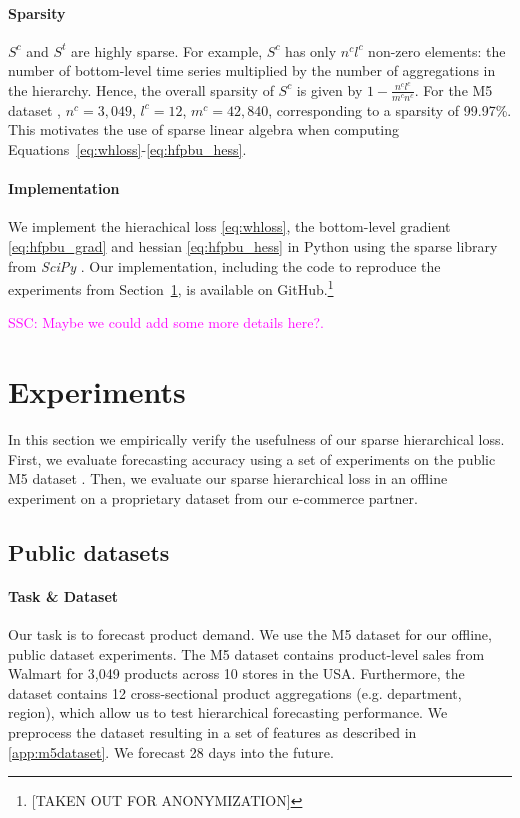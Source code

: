 \documentclass[preprint, 3p, times, twocolumn]{elsarticle}
\newcommand{\ssc}[1]{\textcolor{magenta}{SSC: #1.}}
\begin{document}
\paragraph{Sparsity} \(S^c\) and \(S^t\) are highly sparse. For example, \(S^c\) has only \(n^cl^c\) non-zero elements: the number of bottom-level time series multiplied by the number of aggregations in the hierarchy. Hence, the overall sparsity of \(S^c\) is given by \( 1 - \frac{n^cl^c}{m^cn^c} \). For the M5 dataset \cite{makridakis_m5_2021}, \(n^c = 3,049\), \(l^c = 12\), \(m^c=42,840\), corresponding to a sparsity of 99.97\%. This motivates the use of sparse linear algebra when computing Equations~\eqref{eq:whloss}-\eqref{eq:hfpbu_hess}.

\paragraph{Implementation} We implement the hierachical loss \eqref{eq:whloss}, the bottom-level gradient \eqref{eq:hfpbu_grad} and hessian \eqref{eq:hfpbu_hess} in Python using the sparse library from \textit{SciPy} \cite{virtanen_scipy_2020}. Our implementation, including the code to reproduce the experiments from Section~\ref{sec:experiments}, is available on GitHub.\footnote{[TAKEN OUT FOR ANONYMIZATION]}

\ssc{Maybe we could add some more details here?}

\section{Experiments}
  \label{sec:experiments}
  In this section we empirically verify the usefulness of our sparse hierarchical loss. First, we evaluate forecasting accuracy using a set of experiments on the public M5 dataset \cite{makridakis_m5_2021}. Then, we evaluate our sparse hierarchical loss in an offline experiment on a proprietary dataset from our e-commerce partner.

  \subsection{Public datasets} \label{subsec:publicdatasets}
  \paragraph{Task \& Dataset} Our task is to forecast product demand. We use the M5 dataset \cite{makridakis_m5_2021} for our offline, public dataset experiments. The M5 dataset contains product-level sales from Walmart for 3,049 products across 10 stores in the USA. Furthermore, the dataset contains 12 cross-sectional product aggregations (e.g. department, region), which allow us to test hierarchical forecasting performance. We preprocess the dataset resulting in a set of features as described in \ref{app:m5dataset}. We forecast 28 days into the future.
  
\end{document}
